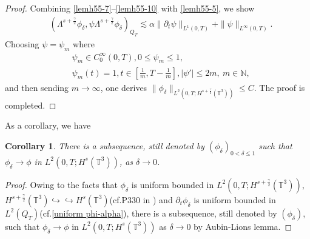 \documentclass[reqno,a4paper,11pt]{amsart}
\theoremstyle{plain}
\newtheorem{corollary}[theorem]{Corollary}
\newtheorem{lemma}[theorem]{Lemma}
\numberwithin{equation}{section}
\begin{document}
\begin{proof}
				
				Combining \eqref{lemh55-7}--\eqref{lemh55-10} with \eqref{lemh55-5}, we show
				\begin{align}
					\label{lemh55-121}
					&
					(\Lambda^{s+\frac{\gamma}{2}}\phi_\delta,\psi\Lambda^{s+\frac{\gamma}{2}}\phi_\delta)_{Q_{T}}
					\lesssim \alpha\|\partial_t\psi\|_{L^{1}(0,T)}+\|\psi\|_{L^{\infty}(0,T)}.
				\end{align}
				Choosing  $\psi=\psi_{m}$ where
				\begin{equation}
					\label{cut-off function}
					\begin{aligned}
						& \psi_{m}\in C_{0}^{\infty}(0,T),  0\leq\psi_{m}\leq1,
						\\& \psi_{m}(t)=1, t\in\left[\frac{1}{m},T-\frac{1}{m}\right], |\psi'|\leq 2m,\ m\in \mathbb{N},
					\end{aligned}
				\end{equation}
				and then sending  $ m \to \infty $,  one derives $\|\phi_{\delta}\|_{L^{2}(0,T;H^{s+\frac{\gamma}{2}}(\mathbb{T}^{3}))}\leq C$. The proof is completed.
			\end{proof}
			
			
			As a corollary, we have
			\begin{corollary}\label{lem5.7}
				There is a subsequence, still denoted by $(\phi_{\delta})_{0<\delta\leq1}$ such that $\phi_{\delta}\rightarrow\phi$ in $L^{2}(0,T;H^{s}(\mathbb{T}^{3}))$, as $\delta\rightarrow0$.
			\end{corollary}
			\begin{proof}
				
				Owing to the facts that $\phi_{\delta}$ is uniform bounded in $L^{2}(0,T;H^{s+\frac{\gamma}{2}}(\mathbb{T}^{3}))$,
				$H^{s+\frac{\gamma}{2}}(\mathbb{T}^{3})\hookrightarrow\hookrightarrow H^{s}(\mathbb{T}^{3})$(cf.P330 in \cite{TM}) and $\partial_{t}\phi_{\delta}$ is uniform bounded in $L^{2}(Q_{T})$(cf.\eqref{uniform phi-alpha}), there is a subsequence, still denoted by $(\phi_{\delta})$, such that
				$\phi_{\delta}\rightarrow\phi$  in $L^{2}(0,T;H^{s}(\mathbb{T}^{3}))$ as $\delta\rightarrow 0$ by Aubin-Lions lemma.
			\end{proof}
			
			
\end{document}

